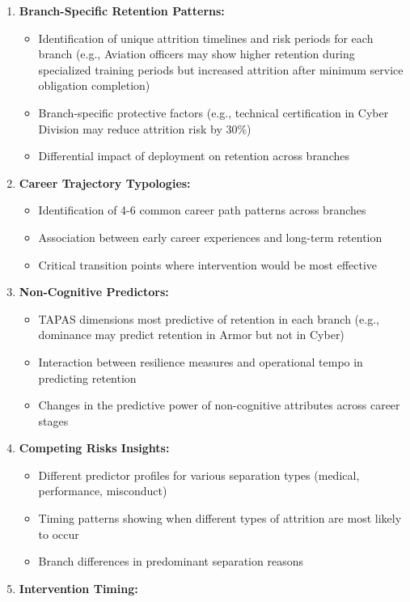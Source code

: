 \documentclass[
  letterpaper,
  DIV=11,
  numbers=noendperiod]{scrartcl}
\providecommand{\tightlist}{%
  \setlength{\itemsep}{0pt}\setlength{\parskip}{0pt}}
\begin{document}
\begin{enumerate}
\def\labelenumi{\arabic{enumi}.}
\tightlist
\item
  \textbf{Branch-Specific Retention Patterns:}

  \begin{itemize}
  \tightlist
  \item
    Identification of unique attrition timelines and risk periods for
    each branch (e.g., Aviation officers may show higher retention
    during specialized training periods but increased attrition after
    minimum service obligation completion)
  \item
    Branch-specific protective factors (e.g., technical certification in
    Cyber Division may reduce attrition risk by 30\%)
  \item
    Differential impact of deployment on retention across branches
  \end{itemize}
\item
  \textbf{Career Trajectory Typologies:}

  \begin{itemize}
  \tightlist
  \item
    Identification of 4-6 common career path patterns across branches
  \item
    Association between early career experiences and long-term retention
  \item
    Critical transition points where intervention would be most
    effective
  \end{itemize}
\item
  \textbf{Non-Cognitive Predictors:}

  \begin{itemize}
  \tightlist
  \item
    TAPAS dimensions most predictive of retention in each branch (e.g.,
    dominance may predict retention in Armor but not in Cyber)
  \item
    Interaction between resilience measures and operational tempo in
    predicting retention
  \item
    Changes in the predictive power of non-cognitive attributes across
    career stages
  \end{itemize}
\item
  \textbf{Competing Risks Insights:}

  \begin{itemize}
  \tightlist
  \item
    Different predictor profiles for various separation types (medical,
    performance, misconduct)
  \item
    Timing patterns showing when different types of attrition are most
    likely to occur
  \item
    Branch differences in predominant separation reasons
  \end{itemize}
\item
  \textbf{Intervention Timing:}


\end{enumerate}
\end{document}
